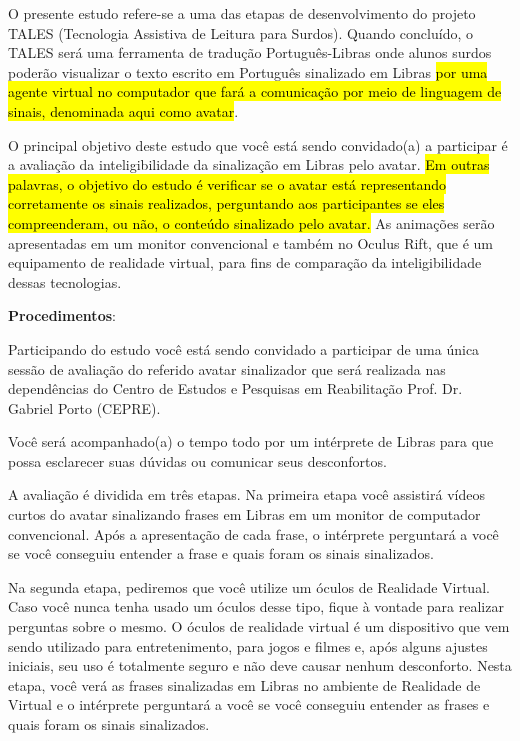 \documentclass[a4paper,11pt,titlepage,singlespacing]{article}
\begin{document}
O presente estudo refere-se a uma das etapas de desenvolvimento do projeto TALES (Tecnologia Assistiva de Leitura para Surdos). Quando concluído, o TALES será uma ferramenta de tradução Português-Libras onde alunos surdos poderão visualizar o texto escrito em Português sinalizado em Libras \hl{por uma agente virtual no computador que fará a comunicação por meio de linguagem de sinais, denominada aqui como avatar}.


O principal objetivo deste estudo que você está sendo convidado(a) a participar é a avaliação da inteligibilidade da sinalização em Libras pelo avatar. \hl{Em outras palavras, o objetivo do estudo é verificar se o avatar está representando corretamente os sinais realizados, perguntando aos participantes se eles compreenderam, ou não, o conteúdo sinalizado pelo avatar.}
As animações serão apresentadas em um monitor convencional e também no Oculus Rift, que é um equipamento de realidade virtual, para fins de comparação da inteligibilidade dessas tecnologias.

\vspace{10pt}
\textbf{Procedimentos}:

Participando do estudo você está sendo convidado a participar de uma única sessão de avaliação do referido avatar sinalizador que será realizada nas dependências do Centro de Estudos e Pesquisas em Reabilitação Prof. Dr. Gabriel Porto (CEPRE).

Você será acompanhado(a) o tempo todo por um intérprete de Libras para que possa esclarecer suas dúvidas ou comunicar seus desconfortos.

A avaliação é dividida em três etapas. Na primeira etapa você assistirá vídeos curtos do avatar sinalizando frases em Libras em um monitor de computador convencional. Após a apresentação de cada frase, o intérprete perguntará a você se você conseguiu entender a frase e quais foram os sinais sinalizados.

Na segunda etapa, pediremos que você utilize um óculos de Realidade Virtual. Caso você nunca tenha usado um óculos desse tipo, fique à vontade para realizar perguntas sobre o mesmo. O óculos de realidade virtual é um dispositivo que vem sendo utilizado para entretenimento, para jogos e filmes e, após alguns ajustes iniciais, seu uso é totalmente seguro e não deve causar nenhum desconforto. Nesta etapa, você verá as frases sinalizadas em Libras no ambiente de Realidade de Virtual e o intérprete perguntará a você se você conseguiu entender as frases e quais foram os sinais sinalizados.
\end{document}
